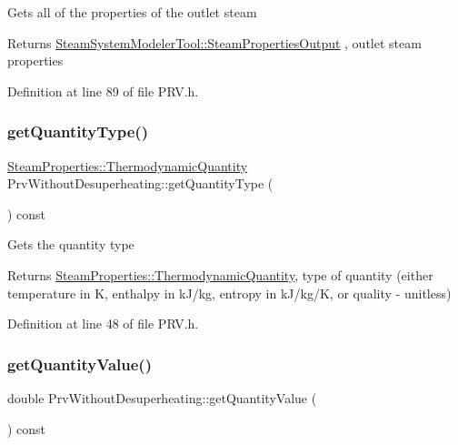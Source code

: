 Gets all of the properties of the outlet steam \begin{DoxyReturn}{Returns}
\hyperlink{struct_steam_system_modeler_tool_1_1_steam_properties_output}{Steam\+System\+Modeler\+Tool\+::\+Steam\+Properties\+Output} , outlet steam properties 
\end{DoxyReturn}


Definition at line 89 of file P\+R\+V.\+h.

\mbox{\label{class_prv_without_desuperheating_ad465c855f0c7271110ed2cb2ebccf081}} 
\subsubsection{\texorpdfstring{get\+Quantity\+Type()}{getQuantityType()}}
{\footnotesize\ttfamily \hyperlink{class_steam_properties_ae0294bedf7d178c2d8fb6aed0f62fbff}{Steam\+Properties\+::\+Thermodynamic\+Quantity} Prv\+Without\+Desuperheating\+::get\+Quantity\+Type (\begin{DoxyParamCaption}{ }\end{DoxyParamCaption}) const\hspace{0.3cm}{\ttfamily [inline]}}

Gets the quantity type

\begin{DoxyReturn}{Returns}
\hyperlink{class_steam_properties_ae0294bedf7d178c2d8fb6aed0f62fbff}{Steam\+Properties\+::\+Thermodynamic\+Quantity}, type of quantity (either temperature in K, enthalpy in k\+J/kg, entropy in k\+J/kg/K, or quality -\/ unitless) 
\end{DoxyReturn}


Definition at line 48 of file P\+R\+V.\+h.

\mbox{\label{class_prv_without_desuperheating_a1113c254f45d08588b0afe4bd1273530}} 
\subsubsection{\texorpdfstring{get\+Quantity\+Value()}{getQuantityValue()}}
{\footnotesize\ttfamily double Prv\+Without\+Desuperheating\+::get\+Quantity\+Value (\begin{DoxyParamCaption}{ }\end{DoxyParamCaption}) const\hspace{0.3cm}{\ttfamily [inline]}}


